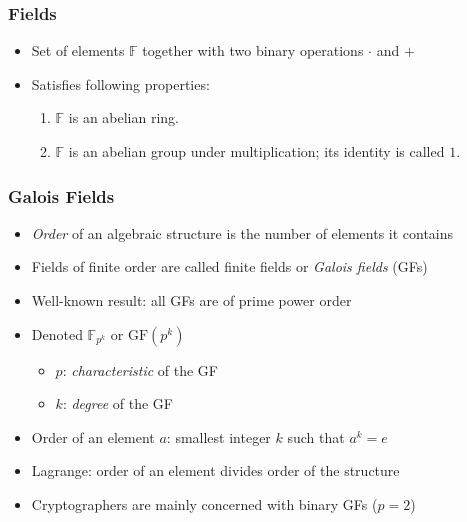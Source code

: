 \begin{frame}
\frametitle{Fields}
\begin{itemize}
  \item Set of elements $\mathbb{F}$ together with two binary operations $\cdot$ and $+$
  \item Satisfies following properties:
  \begin{enumerate}
    \item $\mathbb{F}$ is an abelian ring.
    \item $\mathbb{F}$ is an abelian group under multiplication; its identity is called $1$.
  \end{enumerate}
\end{itemize}
\end{frame}

\begin{frame}
\frametitle{Galois Fields}
\begin{itemize}
  \item \emph{Order} of an algebraic structure is the number of elements it contains
  \item Fields of finite order are called finite fields or \emph{Galois fields} (GFs)
  \item Well-known result: all GFs are of prime power order
  \item Denoted $\mathbb{F}_{p^k}$ or $\mathrm{GF}(p^k)$
  \begin{itemize}
    \item $p$: \emph{characteristic} of the GF
    \item $k$: \emph{degree} of the GF
  \end{itemize}
  \item Order of an element $a$: smallest integer $k$ such that $a^k = e$
  \item Lagrange: order of an element divides order of the structure
  \item Cryptographers are mainly concerned with binary GFs ($p = 2$)
\end{itemize}
\end{frame}

